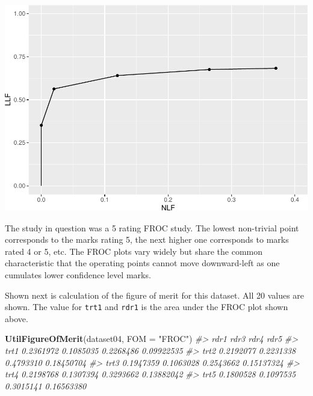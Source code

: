 \documentclass[
]{book}
\newenvironment{Shaded}{\begin{snugshade}}{\end{snugshade}}
\newcommand{\CommentTok}[1]{\textcolor[rgb]{0.56,0.35,0.01}{\textit{#1}}}
\newcommand{\DataTypeTok}[1]{\textcolor[rgb]{0.13,0.29,0.53}{#1}}
\newcommand{\DecValTok}[1]{\textcolor[rgb]{0.00,0.00,0.81}{#1}}
\newcommand{\KeywordTok}[1]{\textcolor[rgb]{0.13,0.29,0.53}{\textbf{#1}}}
\newcommand{\NormalTok}[1]{#1}
\newcommand{\OperatorTok}[1]{\textcolor[rgb]{0.81,0.36,0.00}{\textbf{#1}}}
\newcommand{\StringTok}[1]{\textcolor[rgb]{0.31,0.60,0.02}{#1}}
\begin{document}
\begin{Shaded}
\end{Shaded}

\includegraphics{03-empirical_files/figure-latex/unnamed-chunk-1-1.pdf}

The study in question was a 5 rating FROC study. The lowest non-trivial point corresponds to the marks rating 5, the next higher one corresponds to marks rated 4 or 5, etc. The FROC plots vary widely but share the common characteristic that the operating points cannot move downward-left as one cumulates lower confidence level marks.

Shown next is calculation of the figure of merit for this dataset. All 20 values are shown. The value for \texttt{trt1} and \texttt{rdr1} is the area under the FROC plot shown above.

\begin{Shaded}
\begin{Highlighting}[]
\KeywordTok{UtilFigureOfMerit}\NormalTok{(dataset04, }\DataTypeTok{FOM =} \StringTok{"FROC"}\NormalTok{)}
\CommentTok{#>           rdr1      rdr3      rdr4       rdr5}
\CommentTok{#> trt1 0.2361972 0.1085035 0.2268486 0.09922535}
\CommentTok{#> trt2 0.2192077 0.2231338 0.4793310 0.18450704}
\CommentTok{#> trt3 0.1947359 0.1063028 0.2543662 0.15137324}
\CommentTok{#> trt4 0.2198768 0.1307394 0.3293662 0.13882042}
\CommentTok{#> trt5 0.1800528 0.1097535 0.3015141 0.16563380}
\end{Highlighting}
\end{Shaded}
\end{document}
